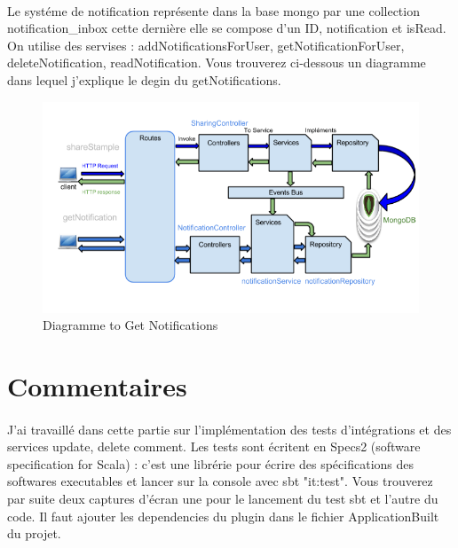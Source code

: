 \paragraph{}
Le systéme de notification représente dans la base mongo par une collection notification\_inbox cette dernière elle se compose d'un ID, notification et isRead.
On utilise des servises : addNotificationsForUser, getNotificationForUser, deleteNotification, readNotification.
Vous trouverez ci-dessous un diagramme dans lequel j'explique le degin du getNotifications.
\begin{figure}[H]
        \centering
                \centering
                \includegraphics[width=\textwidth]{Notifications.png}
               \caption{Diagramme to Get Notifications}
		\label{fig:Diagramme to Get Notifications}
\end{figure}
\section{Commentaires}
\paragraph{}
J'ai travaillé dans cette partie sur l'implémentation des tests d'intégrations et des services update, delete comment.
Les tests sont écritent en Specs2 (software specification for Scala) : c'est une librérie pour écrire des spécifications des softwares executables et lancer sur la console avec sbt "it:test".
Vous trouverez par suite deux captures d'écran une pour le lancement du test sbt et l'autre du code.
Il faut ajouter les dependencies du plugin dans le fichier ApplicationBuilt du projet.

